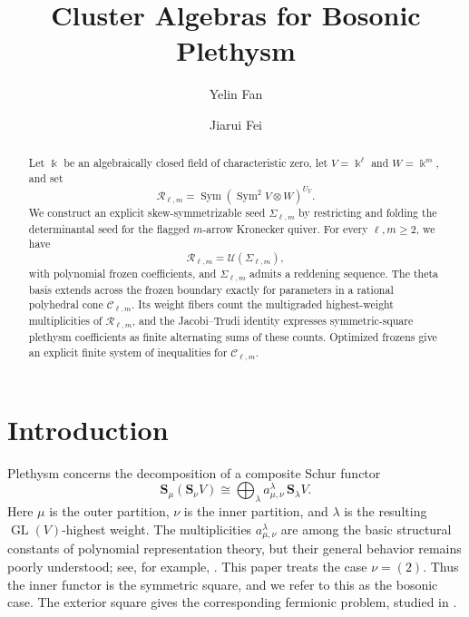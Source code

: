 \documentclass[11pt]{amsart}
\title{Cluster Algebras for Bosonic Plethysm}
\author{Yelin Fan}
\author{Jiarui Fei}
\date{}
\theoremstyle{definition}
\theoremstyle{remark}
\newcommand{\GL}{\operatorname{GL}}
\begin{document}
\raggedbottom
\begin{abstract}
Let $\Bbbk$ be an algebraically closed field of characteristic zero, let
$V=\Bbbk^\ell$ and $W=\Bbbk^m$, and set
\[ \mathcal R_{\ell,m}=\operatorname{Sym}(\operatorname{Sym}^2V\otimes W)^{U_V}. \]
We construct an explicit skew-symmetrizable seed $\Sigma_{\ell,m}$ by
restricting and folding the determinantal seed for the flagged $m$-arrow
Kronecker quiver.  For every $\ell,m\ge2$, we have
\[ \mathcal R_{\ell,m}=\mathcal U(\Sigma_{\ell,m}), \]
with polynomial frozen coefficients, and $\Sigma_{\ell,m}$ admits a
reddening sequence.  The theta basis extends across the frozen boundary
exactly for parameters in a rational polyhedral cone $\mathscr C_{\ell,m}$.
Its weight fibers count the multigraded highest-weight multiplicities of
$\mathcal R_{\ell,m}$, and the Jacobi--Trudi identity expresses symmetric-square
plethysm coefficients as finite alternating sums of these counts.  
Optimized frozens give an explicit finite system of inequalities for $\mathscr C_{\ell,m}$.
\end{abstract}
\maketitle

\section{Introduction}
\label{sec:introduction}

Plethysm concerns the decomposition of a composite Schur functor
\[ \mathbf S_\mu(\mathbf S_\nu V) \cong \bigoplus_\lambda a_{\mu,\nu}^{\lambda}\,\mathbf S_\lambda V. \]
Here $\mu$ is the outer partition, $\nu$ is the inner partition, and
$\lambda$ is the resulting $\GL(V)$-highest weight.  The multiplicities
$a_{\mu,\nu}^{\lambda}$ are among the basic structural constants of polynomial
representation theory, but their general behavior remains poorly understood;
see, for example, \cite[Chapter~I]{Macdonald}.
This paper treats the case $\nu=(2)$.  Thus the inner functor is the
symmetric square, and we refer to this as the bosonic case.  The exterior
square gives the corresponding fermionic problem, studied in \cite{FFP}.
\end{document}
